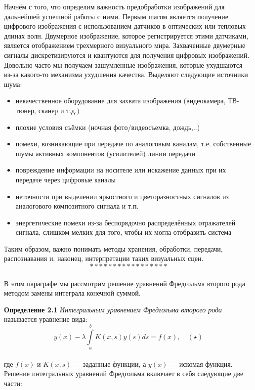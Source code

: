 \documentclass[12pt]{article}
\begin{document}
Начнём с того, что определим важность предобработки изображений для дальнейшей успешной работы с ними. 
Первым шагом является получение цифрового изображения с использованием датчиков в оптических или тепловых длинах волн. Двумерное изображение, которое регистрируется этими датчиками, является отображением трехмерного визуального мира. Захваченные двумерные сигналы дискретизируются и квантуются для получения цифровых изображений.
Довольно часто мы получаем зашумленные изображения, которые ухудшаются из-за какого-то механизма ухудшения качества.
Выделяют следующие источники шума:\\
\begin{itemize}
	\item некачественное оборудование для захвата изображения (видеокамера, ТВ-тюнер, сканер и т.д.)
	\item плохие условия съёмки (ночная фото/видеосъемка, дождь,..)
	\item помехи, возникающие при передаче по аналоговым каналам, т.е. собственные шумы активных компонентов (усилителей) линии передачи
	\item повреждение информации на носителе или искажение данных при их передаче через цифровые каналы
	\item неточности при выделении яркостного и цветоразностных сигналов из аналогового композитного сигнала и т.п.
	\item энергетические помехи из-за беспорядочно распределённых отражателей сигнала, слишком мелких для того, чтобы их могла отобразить система 
\end{itemize}
Таким образом, важно понимать методы хранения, обработки, передачи, распознавания и, наконец, интерпретации таких визуальных сцен.
$$ \ast\ast\ast\ast\ast\ast\ast\ast\ast\ast\ast\ast\ast\ast\ast\ast\ast $$ \\

В этом параграфе мы рассмотрим решение уравнений Фредгольма второго рода методом замены интеграла конечной суммой. 

\textbf{Определение 2.1} \textit{Интегральным уравнением Фредгольма второго рода} называется уравнение вида:\\
$$ y(x) - \lambda \int\limits_a^b K(x, s) y(s) ds = f(x), \quad (\star) $$ \\
где $ f(x) $ и $ K(x, s) $ — заданные функции, а $ y(x) $ — искомая функция.\\ 

Решение интегральных уравнений Фредгольма включает в себя следующие две части: \\
\end{document}
